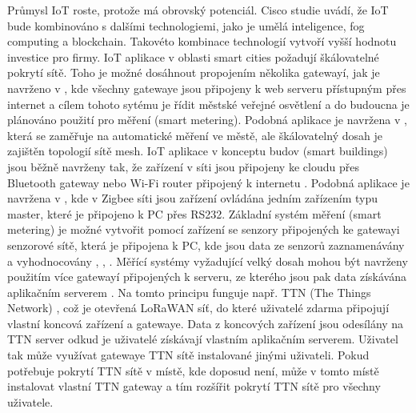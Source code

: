 Průmysl IoT roste, protože má obrovský potenciál. Cisco studie \cite{IoT cisco study} uvádí, že IoT bude kombinováno s dalšími technologiemi, jako je umělá inteligence, fog computing a blockchain. Takovéto kombinace technologií vytvoří vyšší hodnotu investice pro firmy.
IoT aplikace v oblasti smart cities požadují škálovatelné pokrytí sítě. Toho je možné dosáhnout propojením několika gatewayí, jak je navrženo v \cite{Flexible Wireless Sensor Network for smart lighting applications}, kde všechny gatewaye jsou připojeny k web serveru přístupným přes internet a cílem tohoto sytému je řídit městské veřejné osvětlení a do budoucna je plánováno použití pro měření (smart metering).
Podobná aplikace je navržena v \cite{Design and Implementation of an IoT Assisted Real Time ZigBee Mesh WSN}, která se zaměřuje na automatické měření ve městě, ale škálovatelný dosah je zajištěn topologií sítě mesh.
IoT aplikace v konceptu budov (smart buildings) jsou běžně navrženy tak, že zařízení v síti jsou připojeny ke cloudu přes Bluetooth gateway nebo Wi-Fi router připojený k internetu \cite{Internet of Things (IoT) for building Smart Home System}.
Podobná aplikace je navržena  v \cite{Building a Smart Home System with WSN and Service Robot}, kde v Zigbee síti jsou zařízení ovládána jedním zařízením typu master, které je připojeno k PC přes RS232.
Základní systém měření (smart metering) je možné vytvořit pomocí zařízení se senzory připojených ke gatewayi senzorové sítě, která je připojena k PC, kde jsou data ze senzorů zaznamenávány a vyhodnocovány \cite{A Meter Reading System Based on WSN}, \cite{Smart Water Meter System for User-Centric Consumption Measurement}, \cite{Radio Data Infrastructure for Remote Monitoring}.
Měřící systémy vyžadující velký dosah mohou být navrženy použitím více gatewayí připojených k serveru, ze kterého jsou pak data získávána aplikačním serverem \cite{Smart Electric Meter Using LoRA Protocols and Iot applications}. 
Na tomto principu funguje např. TTN (The Things Network) \cite{ttn}, což je otevřená LoRaWAN síť, do které uživatelé zdarma připojují vlastní koncová zařízení a gatewaye. Data z koncových zařízení jsou odesílány na TTN server odkud je uživatelé získávají vlastním aplikačním serverem. Uživatel tak může využívat gatewaye TTN sítě instalované jinými uživateli. Pokud potřebuje pokrytí TTN sítě v místě, kde doposud není, může v tomto místě instalovat vlastní TTN gateway a tím rozšířit pokrytí TTN sítě pro všechny uživatele.


